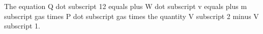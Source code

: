The equation Q dot subscript 12 equals plus W dot subscript v equals plus m subscript gas times P dot subscript gas times the quantity V subscript 2 minus V subscript 1.